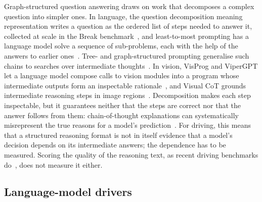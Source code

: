 Graph-structured question answering draws on work that decomposes a complex question into simpler ones. In language, the question decomposition meaning representation writes a question as the ordered list of steps needed to answer it, collected at scale in the Break benchmark~\cite{wolfson2020break}, and least-to-most prompting has a language model solve a sequence of sub-problems, each with the help of the answers to earlier ones~\cite{zhou2023leasttomost}. Tree- and graph-structured prompting generalise such chains to searches over intermediate thoughts~\cite{yao2023tree,besta2023got}. In vision, VisProg and ViperGPT let a language model compose calls to vision modules into a program whose intermediate outputs form an inspectable rationale~\cite{gupta2023visprog,suris2023vipergpt}, and Visual CoT grounds intermediate reasoning steps in image regions~\cite{shao2024visualcot}. Decomposition makes each step inspectable, but it guarantees neither that the steps are correct nor that the answer follows from them: chain-of-thought explanations can systematically misrepresent the true reasons for a model's prediction~\cite{turpin2023unfaithful}. For driving, this means that a structured reasoning format is not in itself evidence that a model's decision depends on its intermediate answers; the dependence has to be measured. Scoring the quality of the reasoning text, as recent driving benchmarks do~\cite{ishaq2025drivelmmo1}, does not measure it either.

\subsection{Language-model drivers}

